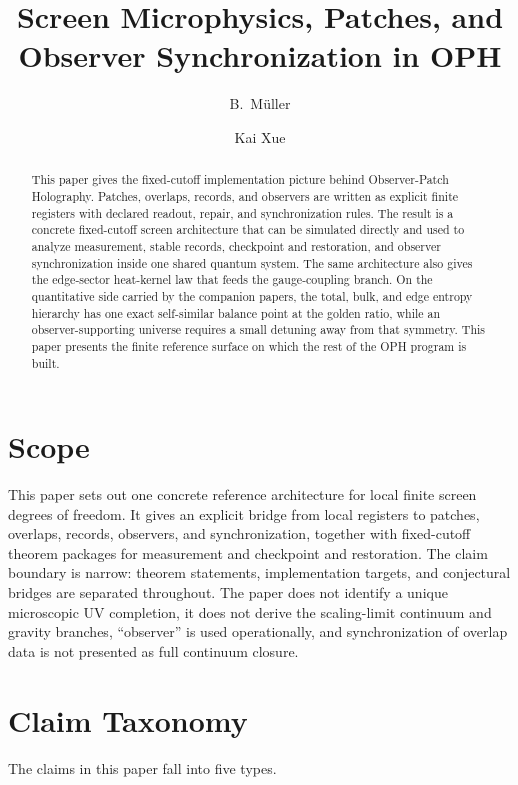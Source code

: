 \documentclass[11pt]{article}
\title{Screen Microphysics, Patches, and Observer Synchronization in OPH}
\author{B.\ M\"uller \and Kai Xue}
\date{\OPHPaperReleaseDate}
\begin{document}
\maketitle
\OPHPaperReleaseBanner

\begin{abstract}
This paper gives the fixed-cutoff implementation picture behind Observer-Patch Holography. Patches, overlaps, records, and observers are written as explicit finite registers with declared readout, repair, and synchronization rules. The result is a concrete fixed-cutoff screen architecture that can be simulated directly and used to analyze measurement, stable records, checkpoint and restoration, and observer synchronization inside one shared quantum system. The same architecture also gives the edge-sector heat-kernel law that feeds the gauge-coupling branch. On the quantitative side carried by the companion papers, the total, bulk, and edge entropy hierarchy has one exact self-similar balance point at the golden ratio, while an observer-supporting universe requires a small detuning away from that symmetry. This paper presents the finite reference surface on which the rest of the OPH program is built.
\end{abstract}

\tableofcontents
\newpage

\section{Scope}

This paper sets out one concrete reference architecture for local finite screen degrees of
freedom. It gives an explicit bridge from local registers to patches, overlaps, records,
observers, and synchronization, together with fixed-cutoff theorem packages for measurement and
checkpoint and restoration. The claim boundary is narrow: theorem statements, implementation targets, and
conjectural bridges are separated throughout. The paper does not identify a unique microscopic UV
completion, it does not derive the scaling-limit continuum and gravity branches, ``observer'' is used operationally, and synchronization of overlap data is not presented as full continuum closure.

\section{Claim Taxonomy}

The claims in this paper fall into five types.
\end{document}

